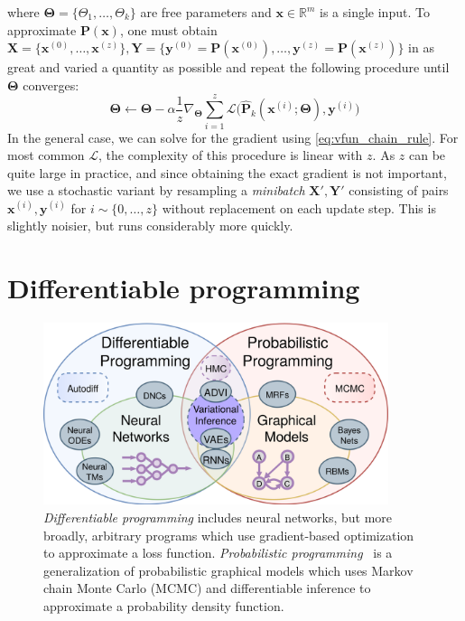 %
where $\bm\Theta = \{\Theta_1, \dots, \Theta_k\}$ are free parameters and $\mathbf{x} \in \mathbb{R}^m$ is a single input. To approximate $\mathbf{P}(\mathbf x)$, one must obtain $\mathbf{X} = \{\mathbf{x}^{(0)}, \dots, \mathbf{x}^{(z)}\}, \mathbf{Y} = \{\mathbf{y}^{(0)} = \mathbf{P}(\mathbf{x}^{(0)}), \dots, \mathbf{y}^{(z)} = \mathbf{P}(\mathbf{x}^{(z)})\}$ in as great and varied a quantity as possible and repeat the following procedure until $\bm\Theta$ converges:
%
\begin{equation} \label{eq:stochastic_grad_descent}
\bm\Theta \leftarrow \bm\Theta - \alpha\frac{1}{z}\nabla_{\bm\Theta} \sum_{i=1}^z\mathcal{L}\big(\mathbf{\hat P}_k(\mathbf{x}^{(i)}; \bm\Theta), \mathbf{y}^{(i)}\big)
\end{equation}
%
In the general case, we can solve for the gradient using \autoref{eq:vfun_chain_rule}. For most common $\mathcal{L}$, the complexity of this procedure is linear with $z$. As $z$ can be quite large in practice, and since obtaining the exact gradient is not important, we use a stochastic variant by resampling a \textit{minibatch} $\mathbf{X}', \mathbf{Y}'$ consisting of pairs $\mathbf{x}^{(i)}, \mathbf{y}^{(i)}$ for $i \sim \{0, \dots, z\}$ without replacement on each update step. This is slightly noisier, but runs considerably more quickly.

\section{Differentiable programming}\label{sec:differentiable-programming}

\begin{figure}
    \centering
    \includegraphics[width=0.90\textwidth]{../figures/diff_prob_prog.png}
    \caption{\textit{Differentiable programming} includes neural networks, but more broadly, arbitrary programs which use gradient-based optimization to approximate a loss function. \textit{Probabilistic programming}~\citep{tristan2014augur, carpenter2017stan, gorinova2018slicstan} is a generalization of probabilistic graphical models which uses Markov chain Monte Carlo (MCMC) and differentiable inference to approximate a probability density function.}
    \label{fig:diff_prob_prog}
\end{figure}

